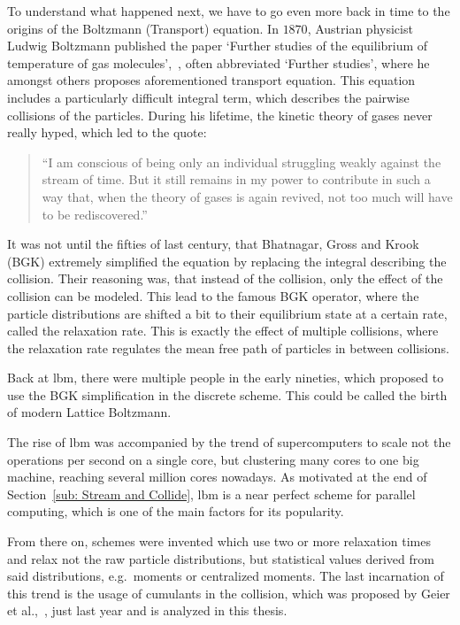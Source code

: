 To understand what happened next, we have to go even more back in time to the origins of the Boltzmann (Transport) equation.
In $1870$, Austrian physicist Ludwig Boltzmann published the paper `Further studies of the equilibrium of temperature of gas molecules',~\cite{Boltzmann1970}, often abbreviated `Further studies', where he amongst others proposes aforementioned transport equation.
This equation includes a particularly difficult integral term, which describes the pairwise collisions of the particles.
During his lifetime, the kinetic theory of gases never really hyped, which led to the quote:
\begin{quotation}
``I am conscious of being only an individual struggling weakly against the stream of time.
But it still remains in my power to contribute in such a way that, when the theory of gases is again revived, not too much will have to be rediscovered.''
\end{quotation}
It was not until the fifties of last century, that Bhatnagar, Gross and Krook (BGK) extremely simplified the equation by replacing the integral describing the collision.
Their reasoning was, that instead of the collision, only the effect of the collision can be modeled.
This lead to the famous BGK operator, where the particle distributions are shifted a bit to their equilibrium state at a certain rate, called the relaxation rate.
This is exactly the effect of multiple collisions, where the relaxation rate regulates the mean free path of particles in between collisions.

Back at \gls{lbm}, there were multiple people in the early nineties, which proposed to use the BGK simplification in the discrete scheme.
This could be called the birth of modern Lattice Boltzmann.

The rise of \gls{lbm} was accompanied by the trend of supercomputers to scale not the operations per second on a single core, but clustering many cores to one big machine, reaching several million cores nowadays.
As motivated at the end of Section~\ref{sub: Stream and Collide}, \gls{lbm} is a near perfect scheme for parallel computing, which is one of the main factors for its popularity.

From there on, schemes were invented which use two or more relaxation times and relax not the raw particle distributions, but statistical values derived from said distributions, e.g.\ moments or centralized moments.
The last incarnation of this trend is the usage of cumulants in the collision, which was proposed by Geier et al.,~\cite{geier2015cumulant}, just last year and is analyzed in this thesis.
